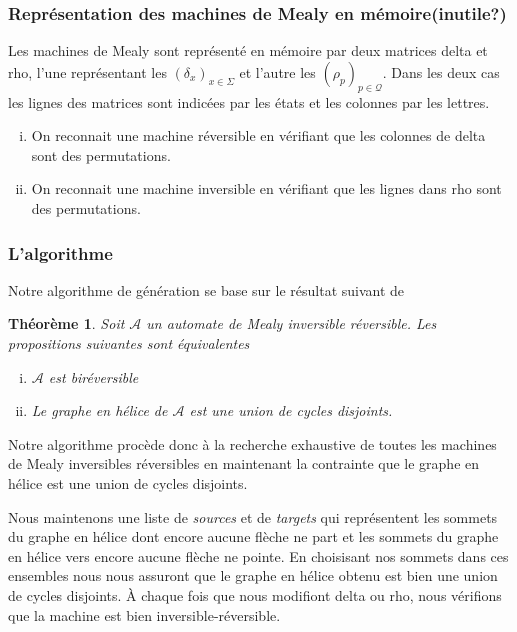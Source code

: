\documentclass[11pt,a4paper]{article}
\newtheorem{thm}{Théorème}
\begin{document}
\subsubsection*{Représentation des machines de Mealy en mémoire(inutile?)}
Les machines de Mealy sont représenté en mémoire par deux matrices \textrm{delta} et \textrm{rho}, l'une représentant les $(\delta_x)_{x\in\Sigma}$ et l'autre les $(\rho_p)_{p\in\mathcal{Q}}$. Dans les deux cas les lignes des matrices sont indicées par les états et les colonnes par les lettres.

\begin{enumerate}[(i)]
\item On reconnait une machine réversible en vérifiant que les colonnes de \textrm{delta}  sont des permutations.
\item On reconnait une machine inversible en vérifiant que les lignes dans \textrm{rho} sont des permutations.
\end{enumerate}

\subsubsection*{L'algorithme}
Notre algorithme de génération se base sur le résultat suivant de \cite{DBLP:journals/corr/abs-1105-4725}

\begin{thm}
  \label{thm:ir-helix}
  Soit $\mathcal{A}$ un automate de Mealy inversible réversible. Les propositions suivantes sont équivalentes

  \begin{enumerate}[(i)]
  \item $\mathcal{A}$ est biréversible
  \item Le graphe en hélice de $\mathcal{A}$ est une union de cycles disjoints.
  \end{enumerate}
\end{thm}

Notre algorithme procède donc à la recherche exhaustive de toutes les machines de Mealy inversibles réversibles en maintenant la contrainte que le graphe en hélice est une union de cycles disjoints.

Nous maintenons une liste de \textit{sources} et de \textit{targets} qui représentent les sommets du graphe en hélice dont encore aucune flèche ne part et les sommets du graphe en hélice vers encore aucune flèche ne pointe. En choisisant nos sommets dans ces ensembles nous nous assuront que le graphe en hélice obtenu est bien une union de cycles disjoints. À chaque fois que nous modifiont \textrm{delta} ou \textrm{rho}, nous vérifions que la machine est bien inversible-réversible.
\end{document}
